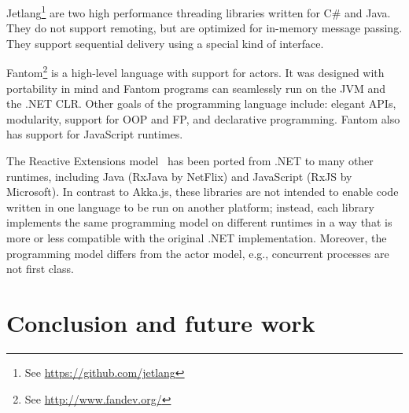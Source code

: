 \documentclass{sig-alternate}
\begin{document}
Jetlang\footnote{See \url{https://github.com/jetlang}} are two high performance threading libraries written for C\# and Java. They do not support remoting, but are optimized for in-memory message passing. They support sequential delivery using a special kind of interface.

Fantom\footnote{See \url{http://www.fandev.org/}} is a high-level language with support for actors. It was designed with portability in mind and Fantom programs can seamlessly run on the JVM and the .NET CLR. Other goals of the programming language include: elegant APIs, modularity, support for OOP and FP, and declarative programming. Fantom also has support for JavaScript runtimes.

The Reactive Extensions model~\cite{Meijer12} has been ported from .NET to
many other runtimes, including Java (RxJava by NetFlix) and JavaScript (RxJS
by Microsoft). In contrast to Akka.js, these libraries are not intended to
enable code written in one language to be run on another platform; instead,
each library implements the same programming model on different runtimes in a
way that is more or less compatible with the original .NET implementation.
Moreover, the programming model differs from the actor model, e.g., concurrent
processes are not first class.


\section{Conclusion and future work}\label{sec:conclusion}
\end{document}
